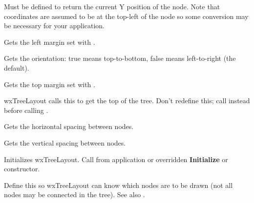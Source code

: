 
Must be defined to return the current Y position of the node. Note that
coordinates are assumed to be at the top-left of the node so some conversion
may be necessary for your application.



Gets the left margin set with .



Gets the orientation: true means top-to-bottom, false means left-to-right (the default).



Gets the top margin set with .



wxTreeLayout calls this to get the top of the tree. Don't redefine this; call
\rtfsp{} instead before calling .



Gets the horizontal spacing between nodes.



Gets the vertical spacing between nodes.



Initializes wxTreeLayout. Call from application or overridden {\bf Initialize}
or constructor.

\label{wxtreelayoutnodeactive}


Define this so wxTreeLayout can know which nodes are to be drawn (not all
nodes may be connected in the tree). See also .

